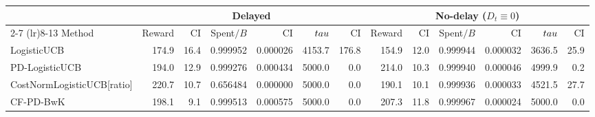 \begin{tabular}{lrrrrrr|rrrrrr}
\toprule
 & \multicolumn{6}{c}{Delayed} & \multicolumn{6}{c}{No-delay ($D_t\equiv0$)} \\
\cmidrule(lr){2-7} \cmidrule(lr){8-13}
Method & Reward & CI & Spent$/B$ & CI & $\\tau$ & CI & Reward & CI & Spent$/B$ & CI & $\\tau$ & CI \\
\midrule
LogisticUCB & 174.9 & 16.4 & 0.999952 & 0.000026 & 4153.7 & 176.8 & 154.9 & 12.0 & 0.999944 & 0.000032 & 3636.5 & 25.9 \\
PD-LogisticUCB & 194.0 & 12.9 & 0.999276 & 0.000434 & 5000.0 & 0.0 & 214.0 & 10.3 & 0.999940 & 0.000046 & 4999.9 & 0.2 \\
CostNormLogisticUCB[ratio] & 220.7 & 10.7 & 0.656484 & 0.000000 & 5000.0 & 0.0 & 190.1 & 10.1 & 0.999936 & 0.000033 & 4521.5 & 27.7 \\
CF-PD-BwK & 198.1 & 9.1 & 0.999513 & 0.000575 & 5000.0 & 0.0 & 207.3 & 11.8 & 0.999967 & 0.000024 & 5000.0 & 0.0 \\
\bottomrule
\end{tabular}
